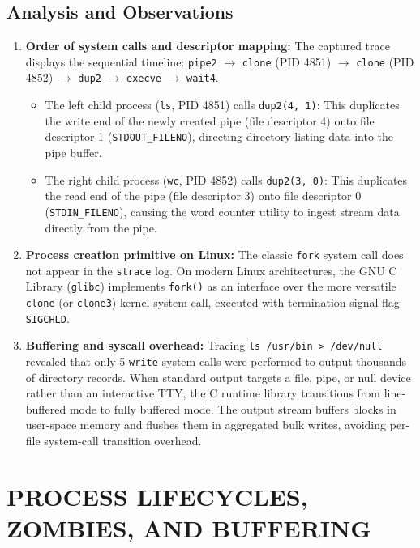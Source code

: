 \documentclass[12pt,a4paper]{report}
\numberwithin{equation}{chapter}
\numberwithin{figure}{chapter}
\numberwithin{table}{chapter}
\begin{document}
\section{Analysis and Observations}
\begin{enumerate}
    \item \textbf{Order of system calls and descriptor mapping:}
    The captured trace displays the sequential timeline: \texttt{pipe2} $\rightarrow$ \texttt{clone} (PID 4851) $\rightarrow$ \texttt{clone} (PID 4852) $\rightarrow$ \texttt{dup2} $\rightarrow$ \texttt{execve} $\rightarrow$ \texttt{wait4}.
    \begin{itemize}
        \item The left child process (\texttt{ls}, PID 4851) calls \texttt{dup2(4, 1)}: This duplicates the write end of the newly created pipe (file descriptor 4) onto file descriptor 1 (\texttt{STDOUT\_FILENO}), directing directory listing data into the pipe buffer.
        \item The right child process (\texttt{wc}, PID 4852) calls \texttt{dup2(3, 0)}: This duplicates the read end of the pipe (file descriptor 3) onto file descriptor 0 (\texttt{STDIN\_FILENO}), causing the word counter utility to ingest stream data directly from the pipe.
    \end{itemize}
    \item \textbf{Process creation primitive on Linux:}
    The classic \texttt{fork} system call does not appear in the \texttt{strace} log. On modern Linux architectures, the GNU C Library (\texttt{glibc}) implements \texttt{fork()} as an interface over the more versatile \texttt{clone} (or \texttt{clone3}) kernel system call, executed with termination signal flag \texttt{SIGCHLD}.
    \item \textbf{Buffering and syscall overhead:}
    Tracing \texttt{ls /usr/bin > /dev/null} revealed that only 5 \texttt{write} system calls were performed to output thousands of directory records. When standard output targets a file, pipe, or null device rather than an interactive TTY, the C runtime library transitions from line-buffered mode to fully buffered mode. The output stream buffers blocks in user-space memory and flushes them in aggregated bulk writes, avoiding per-file system-call transition overhead.
\end{enumerate}

\chapter{PROCESS LIFECYCLES, ZOMBIES, AND BUFFERING}
\end{document}

